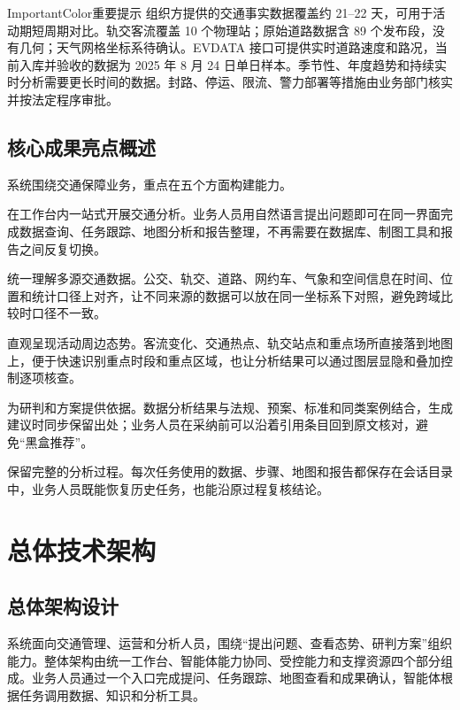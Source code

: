 \documentclass[a4paper,11pt]{article}
\newenvironment{important}{\begin{admonition}{ImportantColor}{重要提示}}{\end{admonition}}
\begin{document}
\begin{important}
组织方提供的交通事实数据覆盖约 21--22 天，可用于活动期短周期对比。轨交客流覆盖 10 个物理站；原始道路数据含 89 个发布段，没有几何；天气网格坐标系待确认。EVDATA 接口可提供实时道路速度和路况，当前入库并验收的数据为 2025 年 8 月 24 日单日样本。季节性、年度趋势和持续实时分析需要更长时间的数据。封路、停运、限流、警力部署等措施由业务部门核实并按法定程序审批。
\end{important}

\subsection{核心成果亮点概述}

系统围绕交通保障业务，重点在五个方面构建能力。

在工作台内一站式开展交通分析。业务人员用自然语言提出问题即可在同一界面完成数据查询、任务跟踪、地图分析和报告整理，不再需要在数据库、制图工具和报告之间反复切换。

统一理解多源交通数据。公交、轨交、道路、网约车、气象和空间信息在时间、位置和统计口径上对齐，让不同来源的数据可以放在同一坐标系下对照，避免跨域比较时口径不一致。

直观呈现活动周边态势。客流变化、交通热点、轨交站点和重点场所直接落到地图上，便于快速识别重点时段和重点区域，也让分析结果可以通过图层显隐和叠加控制逐项核查。

为研判和方案提供依据。数据分析结果与法规、预案、标准和同类案例结合，生成建议时同步保留出处；业务人员在采纳前可以沿着引用条目回到原文核对，避免``黑盒推荐''。

保留完整的分析过程。每次任务使用的数据、步骤、地图和报告都保存在会话目录中，业务人员既能恢复历史任务，也能沿原过程复核结论。

\newpage
\section{总体技术架构}

\subsection{总体架构设计}

系统面向交通管理、运营和分析人员，围绕``提出问题、查看态势、研判方案''组织能力。整体架构由统一工作台、智能体能力协同、受控能力和支撑资源四个部分组成。业务人员通过一个入口完成提问、任务跟踪、地图查看和成果确认，智能体根据任务调用数据、知识和分析工具。
\end{document}
